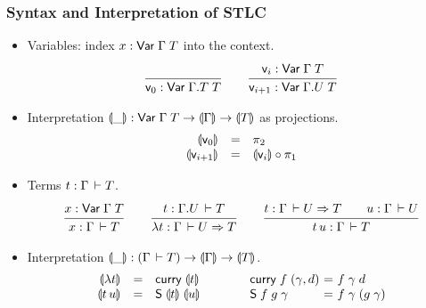 \documentclass[t,fleqn,usenames,dvipsnames]{beamer}
\makeatletter
\renewcommand{\Var}[2]{\tVar\;#1\;#2}
\renewcommand{\ru}[2]{\dfrac{\begin{array}[b]{@{}c@{}} #1 \end{array}}{\begin{array}[t]{@{}l@{}} #2 \end{array}}}
\makeatother
\begin{document}
\begin{frame}%
  \frametitle{Syntax and Interpretation of STLC}
  \vspace{-3ex}
  \begin{itemize}
  \item Variables: index  $x : \Var \Gamma T$ into the context.
\[
  \ru{}{\ind 0 : \Var {\Gamma.T} T}
\qquad
  \ru{\ind i : \Var \Gamma T
    }{\ind{i+1} : \Var {\Gamma.U} T}
\]
  \vspace{-2ex}
  \item Interpretation $\denty\_ : \Var \Gamma T \to \denty \Gamma \to \denty T$
as projections.
\[
\begin{array}{rlll}
  \llparenthesis\mathsf{v}_{0}\rrparenthesis    & = & \pi_2 \\
  \llparenthesis\mathsf{v}_{i+1}\rrparenthesis & = & \llparenthesis\mathsf{v}_{i}\rrparenthesis \circ \pi_1 \\
\end{array}
\]
  \vspace{-2ex}
  \item Terms $t : \Gamma \,\vdash T$.
\[
  \ru{x : \Var \Gamma T
    }{x : \Gamma \der T}
\qquad
  \ru{t : \Gamma.U \der T
    }{\lambda t : \Gamma \der U \To T}
\qquad
  \ru{t : \Gamma \der U \To T \qquad
      u : \Gamma \der U
    }{t\,u : \Gamma \der T}
\]
  \item Interpretation $\llparenthesis\_\rrparenthesis : (\Gamma \,\vdash T) \to \llparenthesis\Gamma\rrparenthesis \to \llparenthesis T\rrparenthesis$.
\[
\begin{array}{rll@{\qquad\qquad}l@{~}l@{~}l}
  \denty {\lambda t} & = & \curry \denty t
    & \curry f\;(\gamma,d) & = & f\;\gamma\;d\\
  \denty {t\,u}      & = & \tS\; \denty t\; \denty u
    & \tS\;f\;g\;\gamma & = & f\;\gamma\;(g\;\gamma) \\
\end{array}
\]
  \vspace{-2ex}
  \end{itemize}
\end{frame}
\end{document}
